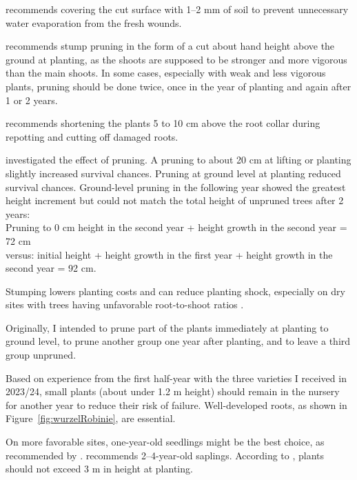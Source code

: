 \citet{bier1958robinie} recommends covering the cut surface with 1–2 mm of soil to prevent unnecessary water evaporation from the fresh wounds.

\citet[p.~78]{erteld1952robinieErtrag} recommends stump pruning in the form of a cut about hand height above the ground at planting, as the shoots are supposed to be stronger and more vigorous than the main shoots. In some cases, especially with weak and less vigorous plants, pruning should be done twice, once in the year of planting and again after 1 or 2 years.

\citet{bund1899robinie} recommends shortening the plants 5 to 10 cm above the root collar during repotting and cutting off damaged roots.

\citet{meginnis1940robinieRueckschnitt} investigated the effect of pruning. A pruning to about 20 cm at lifting or planting slightly increased survival chances. Pruning at ground level at planting reduced survival chances. Ground-level pruning in the following year showed the greatest height increment but could not match the total height of unpruned trees after 2 years:\\
Pruning to 0 cm height in the second year + height growth in the second year = 72 cm\\
versus: initial height + height growth in the first year + height growth in the second year = 92 cm.

Stumping lowers planting costs and can reduce planting shock, especially on dry sites with trees having unfavorable root-to-shoot ratios \citep{south1996toppruning,south1998toppruning,south2016toppruning}.

Originally, I intended to prune part of the plants immediately at planting to ground level, to prune another group one year after planting, and to leave a third group unpruned.

Based on experience from the first half-year with the three varieties I received in 2023/24, small plants (about under 1.2 m height) should remain in the nursery for another year to reduce their risk of failure. Well-developed roots, as shown in Figure~\ref{fig:wurzelRobinie}, are essential.


On more favorable sites, one-year-old seedlings might be the best choice, as recommended by \citet{ciuvat2022robinieRumaenien}. \citet[p.~51]{fekete1931robinieErtragstafel} recommends 2–4-year-old saplings. According to \citet{fuehrer2005robinie}, plants should not exceed 3 m in height at planting.

